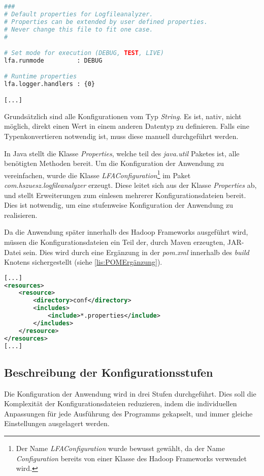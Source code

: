 \begin{lstlisting}[language=Bash,caption=Auszug aus default.properties,label=lis:AuszugDefaultProperties]
###
# Default properties for Logfileanalyzer.
# Properties can be extended by user defined properties.
# Never change this file to fit one case.
#

# Set mode for execution (DEBUG, TEST, LIVE)
lfa.runmode         : DEBUG

# Runtime properties
lfa.logger.handlers : {0}

[...]
\end{lstlisting}

Grundsätzlich sind alle Konfigurationen vom Typ \textit{String}. Es ist, nativ, nicht möglich, direkt einen Wert in einem anderen Datentyp zu definieren. Falls eine Typenkonvertieren notwendig ist, muss diese manuell durchgeführt werden.

In Java stellt die Klasse \textit{Properties}, welche teil des \textit{java.util} Paketes ist, alle benötigten Methoden bereit. Um die Konfiguration der Anwendung zu vereinfachen, wurde die Klasse \textit{LFAConfiguration}\footnote{Der Name \textit{LFAConfiguration} wurde bewusst gewählt, da der Name \textit{Configuration} bereits von einer Klasse des Hadoop Frameworks verwendet wird.} im Paket \textit{com.hszuesz.logfileanalyzer} erzeugt. Diese leitet sich aus der Klasse \textit{Properties} ab, und stellt Erweiterungen zum einlesen mehrerer Konfigurationsdateien bereit. Dies ist notwendig, um eine stufenweise Konfiguration der Anwendung zu realisieren.

Da die Anwendung später innerhalb des Hadoop Frameworks ausgeführt wird, müssen die Konfigurationsdateien ein Teil der, durch Maven erzeugten, JAR-Datei sein. Dies wird durch eine Ergänzung in der \textit{pom.xml} innerhalb des \textit{build} Knotens sichergestellt (siehe \autoref{lis:POMErgänzung}). \\

\begin{lstlisting}[language=XML,caption=pom.xml Ergänzung für Konfigurationsdateien,label=lis:POMErgänzung]
[...]
<resources>
	<resource>
		<directory>conf</directory>
		<includes>
			<include>*.properties</include>
		</includes>
	</resource>
</resources>
[...]
\end{lstlisting}

\subsection{Beschreibung der Konfigurationsstufen}
Die Konfiguration der Anwendung wird in drei Stufen durchgeführt. Dies soll die Komplexität der Konfigurationsdateien reduzieren, indem die individuellen Anpassungen für jede Ausführung des Programms gekapselt, und immer gleiche Einstellungen ausgelagert werden.

